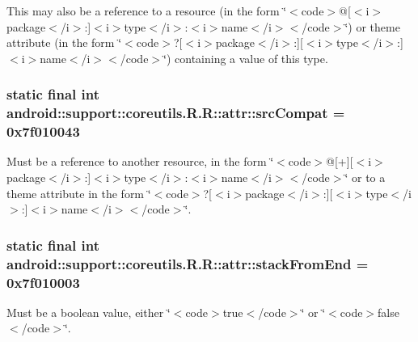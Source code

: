 This may also be a reference to a resource (in the form \char`\"{}$<$code$>$@\mbox{[}$<$i$>$package$<$/i$>$:\mbox{]}$<$i$>$type$<$/i$>$:$<$i$>$name$<$/i$>$$<$/code$>$\char`\"{}) or theme attribute (in the form \char`\"{}$<$code$>$?\mbox{[}$<$i$>$package$<$/i$>$:\mbox{]}\mbox{[}$<$i$>$type$<$/i$>$:\mbox{]}$<$i$>$name$<$/i$>$$<$/code$>$\char`\"{}) containing a value of this type. \hypertarget{classandroid_1_1support_1_1coreutils_1_1_r_1_1attr_be605f85b218d99cae4aed852e0b8274}{
\subsubsection[{srcCompat}]{\setlength{\rightskip}{0pt plus 5cm}static final int android::support::coreutils.R.R::attr::srcCompat = 0x7f010043}}
\label{classandroid_1_1support_1_1coreutils_1_1_r_1_1attr_be605f85b218d99cae4aed852e0b8274}


Must be a reference to another resource, in the form \char`\"{}$<$code$>$@\mbox{[}+\mbox{]}\mbox{[}$<$i$>$package$<$/i$>$:\mbox{]}$<$i$>$type$<$/i$>$:$<$i$>$name$<$/i$>$$<$/code$>$\char`\"{} or to a theme attribute in the form \char`\"{}$<$code$>$?\mbox{[}$<$i$>$package$<$/i$>$:\mbox{]}\mbox{[}$<$i$>$type$<$/i$>$:\mbox{]}$<$i$>$name$<$/i$>$$<$/code$>$\char`\"{}. \hypertarget{classandroid_1_1support_1_1coreutils_1_1_r_1_1attr_8d090a4a9670d9d0993ad9e21d6b1902}{
\subsubsection[{stackFromEnd}]{\setlength{\rightskip}{0pt plus 5cm}static final int android::support::coreutils.R.R::attr::stackFromEnd = 0x7f010003}}
\label{classandroid_1_1support_1_1coreutils_1_1_r_1_1attr_8d090a4a9670d9d0993ad9e21d6b1902}


Must be a boolean value, either \char`\"{}$<$code$>$true$<$/code$>$\char`\"{} or \char`\"{}$<$code$>$false$<$/code$>$\char`\"{}. 

